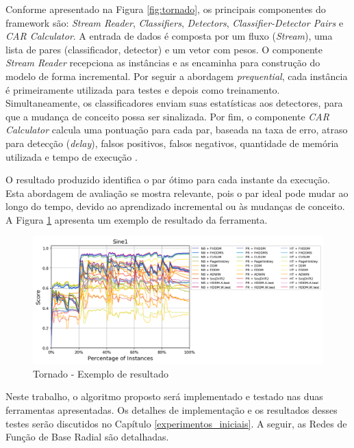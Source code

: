 \documentclass[msc, classic, a4paper]{ufbathesis}
\begin{document}
Conforme apresentado na Figura \ref{fig:tornado}, os principais componentes do framework são:
\textit{Stream Reader}, \textit{Classifiers}, \textit{Detectors}, \textit{Classifier-Detector Pairs} e \textit{CAR Calculator}.
A entrada de dados é composta por um fluxo (\textit{Stream}), uma lista de pares (classificador, detector) e um vetor com pesos.
O componente \textit{Stream Reader} recepciona as instâncias e as encaminha para construção do modelo de forma incremental.
Por seguir a abordagem \textit{prequential}, cada instância é primeiramente utilizada para testes e depois como treinamento.
Simultaneamente, os classificadores enviam suas estatísticas aos detectores, para que a mudança de conceito possa ser sinalizada.
Por fim, o componente \textit{CAR Calculator} calcula uma pontuação para cada par, baseada na taxa de erro, atraso para detecção (\textit{delay}), falsos positivos, falsos negativos, quantidade de memória utilizada e tempo de execução \cite{Pesaranghader:Tornado}.

O resultado produzido identifica o par ótimo para cada instante da execução.
Esta abordagem de avaliação se mostra relevante, pois o par ideal pode mudar ao longo do tempo, devido ao aprendizado incremental ou às mudanças de conceito.
A Figura \ref{fig:tornado_out2} apresenta um exemplo de resultado da ferramenta.

\begin{figure}[ht]
\begin{center}
    \includegraphics[scale=0.6]{imagens/tornado_out2.png}
    \caption{Tornado - Exemplo de resultado \cite{Pesaranghader:Tornado}}
    \label{fig:tornado_out2}
\end{center}
\end{figure}

Neste trabalho, o algoritmo proposto será implementado e testado nas duas ferramentas apresentadas.
Os detalhes de implementação e os resultados desses testes serão discutidos no Capítulo \ref{experimentos_iniciais}.
A seguir, as Redes de Função de Base Radial são detalhadas.
\newpage
\end{document}
